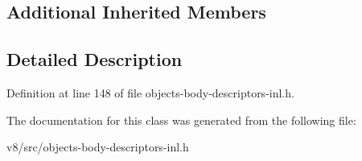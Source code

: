 \subsection*{Additional Inherited Members}


\subsection{Detailed Description}


Definition at line 148 of file objects-\/body-\/descriptors-\/inl.\+h.



The documentation for this class was generated from the following file\+:\begin{DoxyCompactItemize}
\item 
v8/src/objects-\/body-\/descriptors-\/inl.\+h\end{DoxyCompactItemize}
